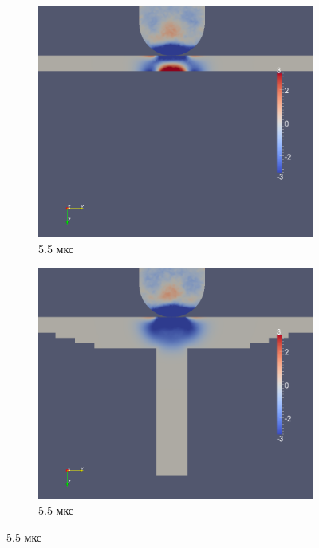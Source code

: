 \begin{figure}[htp]
\begin{subfigure}[b]{0.5\textwidth}
\centering
\includegraphics[width=\textwidth]{png/pkm-experiment/wing-only/wave/syy-0005.png}
\caption{5.5 мкс}
\end{subfigure}
\begin{subfigure}[b]{0.5\textwidth}
\centering
\includegraphics[width=\textwidth]{png/pkm-experiment/wing-stringer/wave/syy-0005.png}
\caption{5.5 мкс}
\end{subfigure}

\end{figure}
